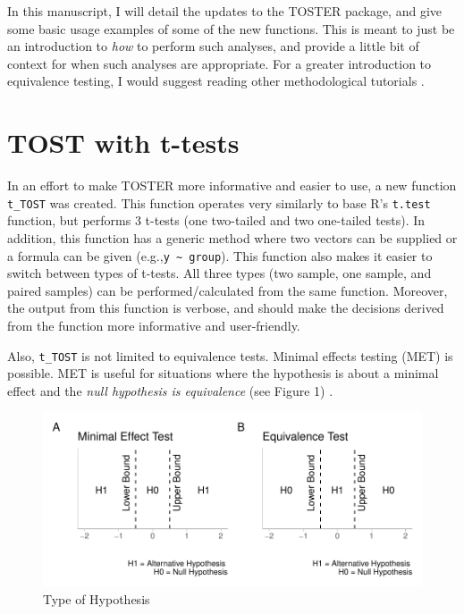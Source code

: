 \documentclass[]{interact}
\theoremstyle{plain}%
\theoremstyle{definition}
\theoremstyle{remark}
\begin{document}
In this manuscript, I will detail the updates to the TOSTER package, and
give some basic usage examples of some of the new functions. This is
meant to just be an introduction to \emph{how} to perform such analyses,
and provide a little bit of context for when such analyses are
appropriate. For a greater introduction to equivalence testing, I would
suggest reading other methodological tutorials
\citep{lakens_ori, lakens2018equivalence, lakens2020improving, mazzolari2022myths}.

\hypertarget{tost-with-t-tests}{%
\section{TOST with t-tests}\label{tost-with-t-tests}}

In an effort to make TOSTER more informative and easier to use, a new
function \texttt{t\_TOST} was created. This function operates very
similarly to base R's \texttt{t.test} function, but performs 3 t-tests
(one two-tailed and two one-tailed tests). In addition, this function
has a generic method where two vectors can be supplied or a formula can
be given (e.g.,\texttt{y\ \textasciitilde{}\ group}). This function also
makes it easier to switch between types of t-tests. All three types (two
sample, one sample, and paired samples) can be performed/calculated from
the same function. Moreover, the output from this function is verbose,
and should make the decisions derived from the function more informative
and user-friendly.

Also, \texttt{t\_TOST} is not limited to equivalence tests. Minimal
effects testing (MET) is possible. MET is useful for situations where
the hypothesis is about a minimal effect and the \emph{null hypothesis
is equivalence} (see Figure 1) \citep{mazzolari2022myths}.

\begin{figure}
\centering
\includegraphics{Avocado_Update_files/figure-latex/hypplot-1.pdf}
\caption{Type of Hypothesis}
\end{figure}
\end{document}
